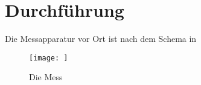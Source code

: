\section{Durchführung}
\label{sec:Durchführung}
Die Messapparatur vor Ort ist nach dem Schema in 
\begin{figure}
    \centering
    \texttt{[image: ]}
    \caption{Die Mess}
\end{figure}